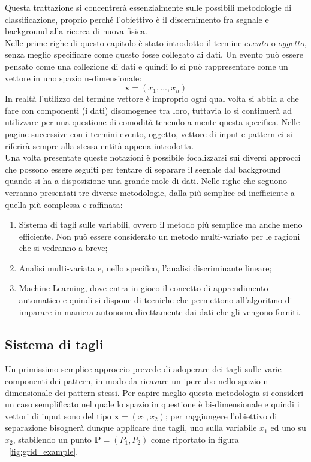 Questa trattazione si concentrerà essenzialmente sulle possibili metodologie di classificazione, proprio perché l'obiettivo è il discernimento fra segnale e background alla ricerca di nuova fisica. \\
Nelle prime righe di questo capitolo è stato introdotto il termine $\textit{evento}$ o $\textit{oggetto}$, senza meglio specificare come questo fosse collegato ai dati. Un evento può essere pensato come una collezione di dati e quindi lo si può rappresentare come un vettore in uno spazio n-dimensionale: 
\begin{equation}
\textbf{x} = (x_{1},...,x_{n})
\end{equation}
In realtà l'utilizzo del termine vettore è improprio ogni qual volta si abbia a che fare con componenti (i dati) disomogenee tra loro, tuttavia lo si continuerà ad utilizzare per una questione di comodità tenendo a mente questa specifica. Nelle pagine successive con i termini evento, oggetto, vettore di input e pattern ci si riferirà sempre alla stessa entità appena introdotta. \\ 
Una volta presentate queste notazioni è possibile focalizzarsi sui diversi approcci che possono essere seguiti per tentare di separare il segnale dal background quando si ha a disposizione una grande mole di dati. Nelle righe che seguono verranno presentati tre diverse metodologie, dalla più semplice ed inefficiente a quella più complessa e raffinata:
\begin{enumerate}
	\item Sistema di tagli sulle variabili, ovvero il metodo più semplice ma anche meno efficiente. Non può essere considerato un metodo multi-variato per le ragioni che si vedranno a breve;
	\item Analisi multi-variata e, nello specifico, l'analisi discriminante lineare;
	\item Machine Learning, dove entra in gioco il concetto di apprendimento automatico e quindi si dispone di tecniche che permettono all'algoritmo di imparare in maniera autonoma direttamente dai dati che gli vengono forniti.
\end{enumerate}

\newpage

\subsection{Sistema di tagli}
\label{sistema di tagli}
Un primissimo semplice approccio prevede di adoperare dei tagli sulle varie componenti dei pattern, in modo da ricavare un ipercubo nello spazio n-dimensionale dei pattern stessi. Per capire meglio questa metodologia si consideri un caso semplificato nel quale lo spazio in questione è bi-dimensionale e quindi i vettori di input sono del tipo $\textbf{x} = (x_1,x_2)$; per raggiungere l'obiettivo di separazione bisognerà dunque applicare due tagli, uno sulla variabile $x_1$ ed uno su $x_2$, stabilendo un punto $\textbf{P} = (P_1,P_2)$ come riportato in figura ~\ref{fig:grid_example}.


